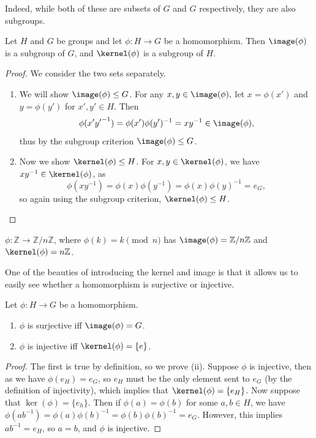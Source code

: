 \documentclass[a4paper]{scrartcl}
\begin{document}
Indeed, while both of these are subsets of $G$ and $G$ respectively, they are also subgroups.

\begin{proposition}
	Let $H$ and $G$ be groups and let $\phi : H \rightarrow G$ be a homomorphism. Then $\image(\phi)$ is a subgroup of $G$, and $\kernel(\phi)$ is a subgroup of $H$.
\end{proposition}
\begin{proof}
	We consider the two sets separately.
	\begin{enumerate}
		\item We will show $\image(\phi) \leq G$. For any $x, y \in \image(\phi),$ let $x = \phi(x')$ and $y = \phi(y')$ for $x', y' \in H$. Then
		$$
		\phi(x' {y'}^{-1}) = \phi(x')\phi(y')^{-1} = x y^{-1} \in \image(\phi),
		$$
		thus by the subgroup criterion $\image(\phi) \leq G$.
		\item Now we show $\kernel(\phi) \leq H$. For $x, y \in \kernel(\phi)$, we have $xy^{-1} \in \kernel(\phi)$, as 
		$$
		\phi(xy^{-1}) = \phi(x)\phi(y^{-1}) = \phi(x)\phi(y)^{-1} = e_G,
		$$
		so again using the subgroup criterion, $\kernel(\phi) \leq H$. 
	\end{enumerate}
\end{proof}

\begin{example}
	$\phi : \mathbb{Z} \rightarrow \mathbb{Z}/n\mathbb{Z}$, where $\phi(k) = k \pmod{n}$ has $\image(\phi) = \mathbb{Z}/n\mathbb{Z}$ and $\kernel(\phi) = n\mathbb{Z}$.
\end{example}

One of the beauties of introducing the kernel and image is that it allows us to easily see whether a homomorphism is surjective or injective.

\begin{proposition}
	Let $\phi : H \rightarrow G$ be a homomorphism.
	\begin{enumerate}[label=(\roman*)]
		\item $\phi$ is surjective iff $\image(\phi) = G$.
		\item $\phi$ is injective iff $\kernel(\phi) = \{e\}$.
	\end{enumerate}	
\end{proposition}
\begin{proof}
	The first is true by definition, so we prove (ii). Suppose $\phi$ is injective, then as we have $\phi(e_H) = e_G$, so $e_H$ must be the only element sent to $e_G$ (by the definition of injectivity), which implies that $\kernel(\phi) = \{ e_H \}$.
	Now suppose that $\ker(\phi) = \{ e_h \}$. Then if $\phi(a) = \phi(b)$ for some $a, b \in H$, we  have $\phi(ab^{-1}) = \phi(a)\phi(b)^{-1} = \phi(b)\phi(b)^{-1} = e_G$. However, this implies $ab^{-1} = e_H$, so $a = b$, and $\phi$ is injective.
\end{proof}
\end{document}
